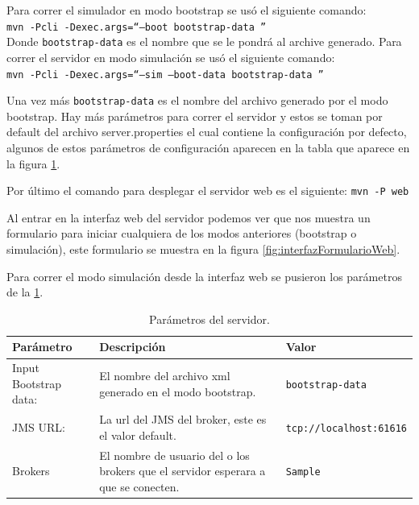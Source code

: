 Para correr el simulador en modo bootstrap se usó el siguiente comando:\\
\texttt{mvn -Pcli -Dexec.args=``--boot bootstrap-data ''}\\
Donde \texttt{bootstrap-data} es el nombre que se le pondrá al archive generado.
Para correr el servidor en modo simulación se usó el siguiente comando:\\
\texttt{mvn -Pcli -Dexec.args=``--sim --boot-data bootstrap-data ''}

Una vez más \texttt{bootstrap-data} es el nombre del archivo generado por el modo bootstrap. Hay más parámetros para correr el servidor y estos se toman por default del archivo server.properties el cual contiene la configuración por defecto, algunos de estos parámetros de configuración aparecen en la tabla que aparece en la figura \ref{tab:parametros}.

Por último el comando para desplegar el servidor web es el siguiente:
\texttt{mvn -P web}

Al entrar en la interfaz web del servidor podemos ver que nos muestra un formulario para iniciar cualquiera de los modos anteriores (bootstrap o simulación), este formulario se muestra en la figura \ref{fig:interfazFormularioWeb}.

Para correr el modo simulación desde la interfaz web se pusieron los parámetros de la \ref{tab:parametros}.

\begin{table}[!h]
	\begin{center}
		\begin{tabular}{|p{2.5cm}|p{7cm}|p{4cm}|}\hline
			\textbf{Parámetro} & \textbf{Descripción} & \textbf{Valor} \\ \hline
				Input Bootstrap data:  &El nombre del archivo xml generado en el modo bootstrap. & \texttt{bootstrap-data} \\ \hline
				JMS URL: & La url del JMS del broker, este es el valor default. & \texttt{tcp://localhost:61616} \\\hline
				Brokers  & El nombre de usuario del o los brokers que el servidor esperara a que se conecten. & \texttt{Sample}
			\\ \hline
		\end{tabular}			
	\end{center}
	\caption{ Parámetros del servidor.}
	\label{tab:parametros}
\end{table}


